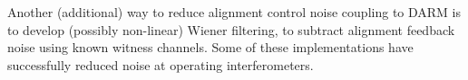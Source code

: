 Another (additional) way to reduce alignment control noise coupling to DARM is to develop (possibly non-linear) Wiener filtering, to subtract alignment feedback noise using known witness channels. Some of these implementations have successfully reduced noise at operating interferometers. 




